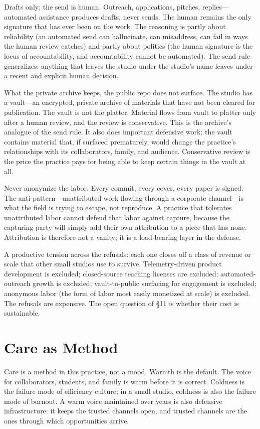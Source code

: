 \documentclass[10pt,letterpaper,twocolumn]{article}
\begin{document}
Drafts only; the send is human. Outreach, applications, pitches, replies---automated assistance produces drafts, never sends. The human remains the only signature that has ever been on the work. The reasoning is partly about reliability (an automated send can hallucinate, can misaddress, can fail in ways the human review catches) and partly about politics (the human signature is the locus of accountability, and accountability cannot be automated). The send rule generalizes: anything that leaves the studio under the studio's name leaves under a recent and explicit human decision.

What the private archive keeps, the public repo does not surface. The studio has a vault---an encrypted, private archive of materials that have not been cleared for publication. The vault is not the platter. Material flows from vault to platter only after a human review, and the review is conservative. This is the archive's analogue of the send rule. It also does important defensive work: the vault contains material that, if surfaced prematurely, would change the practice's relationships with its collaborators, family, and audience. Conservative review is the price the practice pays for being able to keep certain things in the vault at all.

Never anonymize the labor. Every commit, every cover, every paper is signed. The anti-pattern---unattributed work flowing through a corporate channel---is what the field is trying to escape, not reproduce. A practice that tolerates unattributed labor cannot defend that labor against capture, because the capturing party will simply add their own attribution to a piece that has none. Attribution is therefore not a vanity; it is a load-bearing layer in the defense.

A productive tension across the refusals: each one closes off a class of revenue or scale that other small studios use to survive. Telemetry-driven product development is excluded; closed-source teaching licenses are excluded; automated-outreach growth is excluded; vault-to-public surfacing for engagement is excluded; anonymous labor (the form of labor most easily monetized at scale) is excluded. The refusals are expensive. The open question of \S11 is whether their cost is sustainable.

\section{Care as Method}

Care is a method in this practice, not a mood. Warmth is the default. The voice for collaborators, students, and family is warm before it is correct. Coldness is the failure mode of efficiency culture; in a small studio, coldness is also the failure mode of burnout. A warm voice maintained over years is also defensive infrastructure: it keeps the trusted channels open, and trusted channels are the ones through which opportunities arrive.
\end{document}
